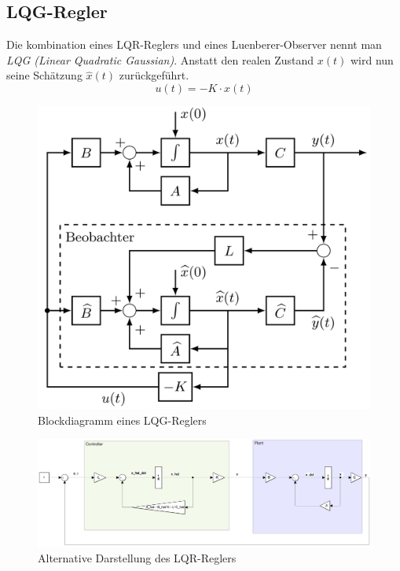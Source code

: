\subsection{LQG-Regler}
    Die kombination eines LQR-Reglers und eines Luenberer-Observer nennt man \textit{LQG (Linear Quadratic Gaussian)}. Anstatt den realen Zustand $x(t)$ wird nun seine Schätzung $\widehat{x}(t)$ zurückgeführt.
    \begin{equation*}
        u(t) = -K\cdot\widehat{x}(t)
    \end{equation*}
    \begin{figure}[H]
        \centering
        \includegraphics[width = 0.6\linewidth]{images/10/LQG_vanilla.jpeg}
        \caption{Blockdiagramm eines LQG-Reglers}
    \end{figure}
    
    \begin{figure}[H]
        \centering
        \includegraphics[width = \linewidth]{images/10/LQR_alt.png}
        \caption{Alternative Darstellung des LQR-Reglers}
    \end{figure}
    
